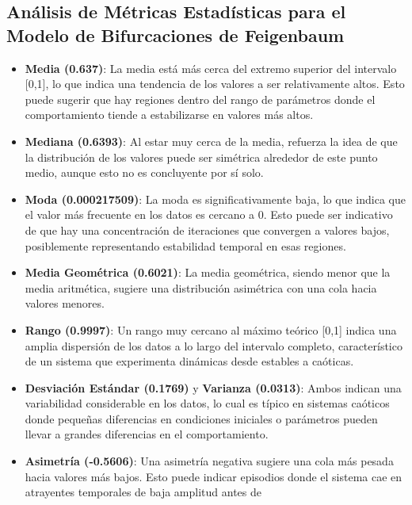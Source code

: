 \documentclass[11pt]{article}
\begin{document}
    \hypertarget{anuxe1lisis-de-muxe9tricas-estaduxedsticas-para-el-modelo-de-bifurcaciones-de-feigenbaum}{%
\subsection{Análisis de Métricas Estadísticas para el Modelo de
Bifurcaciones de
Feigenbaum}\label{anuxe1lisis-de-muxe9tricas-estaduxedsticas-para-el-modelo-de-bifurcaciones-de-feigenbaum}}

\begin{itemize}
\item
  \textbf{Media (0.637)}: La media está más cerca del extremo superior
  del intervalo {[}0,1{]}, lo que indica una tendencia de los valores a
  ser relativamente altos. Esto puede sugerir que hay regiones dentro
  del rango de parámetros donde el comportamiento tiende a estabilizarse
  en valores más altos.
\item
  \textbf{Mediana (0.6393)}: Al estar muy cerca de la media, refuerza la
  idea de que la distribución de los valores puede ser simétrica
  alrededor de este punto medio, aunque esto no es concluyente por sí
  solo.
\item
  \textbf{Moda (0.000217509)}: La moda es significativamente baja, lo
  que indica que el valor más frecuente en los datos es cercano a 0.
  Esto puede ser indicativo de que hay una concentración de iteraciones
  que convergen a valores bajos, posiblemente representando estabilidad
  temporal en esas regiones.
\item
  \textbf{Media Geométrica (0.6021)}: La media geométrica, siendo menor
  que la media aritmética, sugiere una distribución asimétrica con una
  cola hacia valores menores.
\item
  \textbf{Rango (0.9997)}: Un rango muy cercano al máximo teórico
  {[}0,1{]} indica una amplia dispersión de los datos a lo largo del
  intervalo completo, característico de un sistema que experimenta
  dinámicas desde estables a caóticas.
\item
  \textbf{Desviación Estándar (0.1769)} y \textbf{Varianza (0.0313)}:
  Ambos indican una variabilidad considerable en los datos, lo cual es
  típico en sistemas caóticos donde pequeñas diferencias en condiciones
  iniciales o parámetros pueden llevar a grandes diferencias en el
  comportamiento.
\item
  \textbf{Asimetría (-0.5606)}: Una asimetría negativa sugiere una cola
  más pesada hacia valores más bajos. Esto puede indicar episodios donde
  el sistema cae en atrayentes temporales de baja amplitud antes de

\end{itemize}
\end{document}
